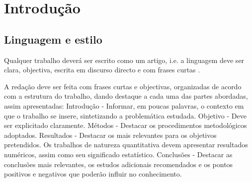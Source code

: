 % 
%  
%
\chapter{Introdução}
\label{cha:introduction}

\section{Linguagem e estilo}
Qualquer trabalho deverá ser escrito como um artigo, i.e. a linguagem deve ser clara, objectiva, escrita em discurso directo e com frases curtas \cite{gustavii2016write}.

A redação deve ser feita com frases curtas e objectivas, organizadas de acordo com a estrutura do trabalho, dando destaque a cada uma das partes abordadas, assim apresentadas: Introdução - Informar, em poucas palavras, o contexto em que o trabalho se insere, sintetizando a problemática estudada. Objetivo - Deve ser explicitado claramente. Métodos - Destacar os procedimentos metodológicos adoptados. Resultados - Destacar os mais relevantes para os objetivos pretendidos. Os trabalhos de natureza quantitativa devem apresentar resultados numéricos, assim como seu significado estatístico. Conclusões - Destacar as conclusões mais relevantes, os estudos adicionais recomendados e os pontos positivos e negativos que poderão influir no conhecimento. 

